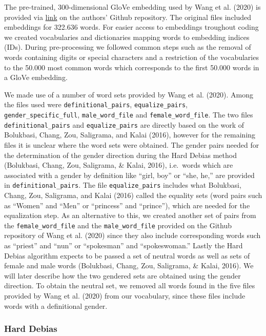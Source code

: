 \documentclass[
  english,
  man,floatsintext]{apa6}
\begin{document}
The pre-trained, 300-dimensional GloVe embedding used by Wang et al. (2020) is provided via \href{http://www.cs.virginia.edu/~tw8cb/word_embeddings/}{link} on the authors' Github repository. The original files included embeddings for 322.636 words. For easier access to embeddings troughout coding we created vocabularies and dictionaries mapping words to embedding indices (IDs). During pre-processing we followed common steps such as the removal of words containing digits or special characters and a restriction of the vocabularies to the 50.000 most common words which corresponds to the first 50.000 words in a GloVe embedding.

We made use of a number of word sets provided by Wang et al. (2020). Among the files used were \texttt{definitional\_pairs}, \texttt{equalize\_pairs}, \texttt{gender\_specific\_full}, \texttt{male\_word\_file} and \texttt{female\_word\_file}. The two files \texttt{definitional\_pairs} and \texttt{equalize\_pairs} are directly based on the work of Bolukbasi, Chang, Zou, Saligrama, and Kalai (2016), however for the remaining files it is unclear where the word sets were obtained. The gender pairs needed for the determination of the gender direction during the Hard Debias method (Bolukbasi, Chang, Zou, Saligrama, \& Kalai, 2016), i.e.~words which are associated with a gender by definition like ``girl, boy'' or ``she, he,'' are provided in \texttt{definitional\_pairs}. The file \texttt{equalize\_pairs} includes what Bolukbasi, Chang, Zou, Saligrama, and Kalai (2016) called the equality sets (word pairs such as ``Women'' and ``Men'' or ``princess'' and ``prince''), which are needed for the equalization step. As an alternative to this, we created another set of pairs from the \texttt{female\_word\_file} and the \texttt{male\_word\_file} provided on the Github repository of Wang et al. (2020) since they also include corresponding words such as ``priest'' and ``nun'' or ``spokesman'' and ``spokeswoman.'' Lastly the Hard Debias algorithm expects to be passed a set of neutral words as well as sets of female and male words (Bolukbasi, Chang, Zou, Saligrama, \& Kalai, 2016). We will later describe how the two gendered sets are obtained using the gender direction. To obtain the neutral set, we removed all words found in the five files provided by Wang et al. (2020) from our vocabulary, since these files include words with a definitional gender.

\hypertarget{hard-debias}{%
\subsubsection{Hard Debias}\label{hard-debias}}
\end{document}
